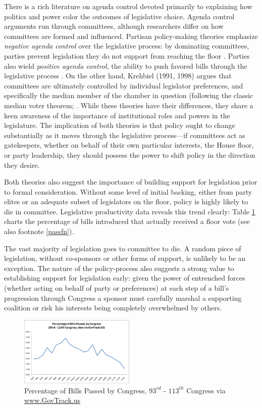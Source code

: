 \documentclass[pdftex,12pt]{llncs}
\begin{document}
There is a rich literature on agenda control devoted primarily to explaining how politics and power color the outcomes of legislative choice. 
Agenda control arguments run through committees, although researchers differ on how committees are formed and influenced. 
Partisan policy-making theories emphasize \textit{negative agenda control} over the legislative process: by dominating committees, parties prevent legislation they do not support from reaching the floor \parencite{cm93,cm05}.
Parties also wield \textit{positive agenda control}, the ability to push favored bills through the legislative process \parencite{r91,a95}. 
On the other hand, Krehbiel (1991, 1998) argues that committees are ultimately controlled by individual legislator preferences, and specifically the median member of the chamber in question (following the classic median voter theorem; \cite{b48}. 
While these theories have their differences, they share a keen awareness of the importance of institutional roles and powers in the legislature. 
The implication of both theories is that policy ought to change substantially as it moves through the legislative process---if committees act as gatekeepers, whether on behalf of their own particular interests, the House floor, or party leadership, they should possess the power to shift policy in the direction they desire.   

Both theories also suggest the importance of building support for legislation prior to formal consideration. 
Without some level of initial backing, either from party elites or an adequate subset of legislators on the floor, policy is highly likely to die in committee. 
Legislative productivity data reveals this trend clearly: Table \ref{billpassrate} charts the percentage of bills introduced that actually received a floor vote (see also footnote \ref{passfn}).

The vast majority of legislation goes to committee to die. 
A random piece of legislation, without co-sponsors or other forms of support, is unlikely to be an exception. 
The nature of the policy-process also suggests a strong value to establishing support for legislation early: given the power of entrenched forces (whether acting on behalf of party or preferences) at each step of a bill's progression through Congress a sponsor must carefully marshal a supporting coalition or risk his interests being completely overwhelmed by others.

\begin{figure}
\includegraphics[width=0.49\textwidth]{percentPassed.eps}
\caption[ ]{Percentage of Bills Passed by Congress, $93^{rd}$ - $113^{th}$ Congress via \url{www.GovTrack.us}}
\label{billpassrate}
\end{figure}
   
\end{document}
